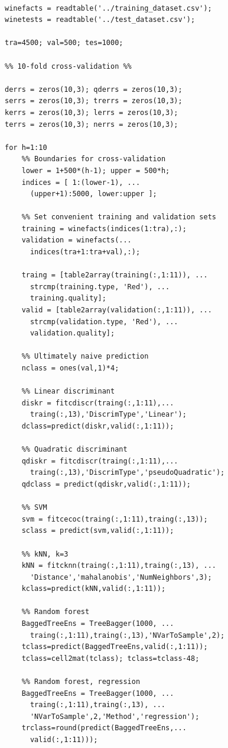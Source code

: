 \documentclass[twoside]{article}
\begin{document}
\begin{multicols}{2}
{\begin{verbatim}

winefacts = readtable('../training_dataset.csv');
winetests = readtable('../test_dataset.csv');

tra=4500; val=500; tes=1000;

%% 10-fold cross-validation %%

derrs = zeros(10,3); qderrs = zeros(10,3); 
serrs = zeros(10,3); trerrs = zeros(10,3); 
kerrs = zeros(10,3); lerrs = zeros(10,3); 
terrs = zeros(10,3); nerrs = zeros(10,3);

for h=1:10
    %% Boundaries for cross-validation
    lower = 1+500*(h-1); upper = 500*h;
    indices = [ 1:(lower-1), ... 
      (upper+1):5000, lower:upper ];

    %% Set convenient training and validation sets
    training = winefacts(indices(1:tra),:);
    validation = winefacts(...
      indices(tra+1:tra+val),:);

    traing = [table2array(training(:,1:11)), ... 
      strcmp(training.type, 'Red'), ...
      training.quality];
    valid = [table2array(validation(:,1:11)), ...
      strcmp(validation.type, 'Red'), ...
      validation.quality];

    %% Ultimately naive prediction
    nclass = ones(val,1)*4;
    
    %% Linear discriminant
    diskr = fitcdiscr(traing(:,1:11),...
      traing(:,13),'DiscrimType','Linear');
    dclass=predict(diskr,valid(:,1:11));

    %% Quadratic discriminant
    qdiskr = fitcdiscr(traing(:,1:11),...
      traing(:,13),'DiscrimType','pseudoQuadratic');
    qdclass = predict(qdiskr,valid(:,1:11));
    
    %% SVM
    svm = fitcecoc(traing(:,1:11),traing(:,13));
    sclass = predict(svm,valid(:,1:11));
    
    %% kNN, k=3
    kNN = fitcknn(traing(:,1:11),traing(:,13), ...
      'Distance','mahalanobis','NumNeighbors',3);
    kclass=predict(kNN,valid(:,1:11));

    %% Random forest
    BaggedTreeEns = TreeBagger(1000, ...
      traing(:,1:11),traing(:,13),'NVarToSample',2);
    tclass=predict(BaggedTreeEns,valid(:,1:11));
    tclass=cell2mat(tclass); tclass=tclass-48;

    %% Random forest, regression
    BaggedTreeEns = TreeBagger(1000, ...
      traing(:,1:11),traing(:,13), ...
      'NVarToSample',2,'Method','regression');    
    trclass=round(predict(BaggedTreeEns,...
      valid(:,1:11)));
        

\end{verbatim}}
\end{multicols}
\end{document}

